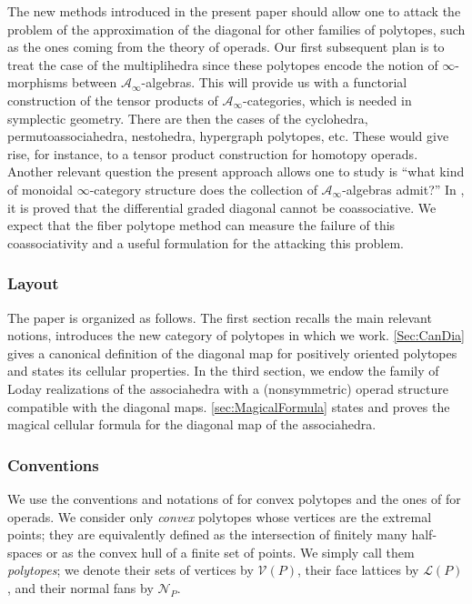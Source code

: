 \documentclass[11pt]{article}
\numberwithin{equation}{section}\providecommand{\No}{}
\let\mathcal\mathscr
\theoremstyle{plain}
\theoremstyle{definition}
\newcommand{\La}{\mathcal{L}}
\renewcommand{\No}{\mathcal{N}}
\newcommand{\Ve}{\mathcal{V}}
\begin{document}
The new methods introduced in the present paper should allow one to attack the problem of the approximation of the diagonal for other families of polytopes, such as the ones coming from the theory of operads.
Our first subsequent plan
is to treat the case of the multiplihedra \cite{Stasheff70} since these polytopes encode the notion of $\infty$-morphisms between $\mathcal{A}_\infty$-algebras. This will provide us with a functorial construction of the tensor products of $\mathcal{A}_\infty$-categories, which is needed in symplectic geometry.
There are then the cases of the cyclohedra, permutoassociahedra, nestohedra, hypergraph polytopes, etc. These would give rise, for instance, to a tensor product construction for homotopy operads. Another relevant question the present approach allows one to study is ``what kind of monoidal $\infty$-category structure does the collection of $\mathcal{A}_\infty$-algebras admit?''
In \cite{MarklShnider06}, it is proved that the differential graded diagonal cannot be coassociative. We expect that the fiber polytope method can measure the failure of this coassociativity and a useful formulation for the attacking this problem.

\subsubsection*{Layout}
The paper is organized as follows. The first section recalls the main relevant notions, introduces the new category of polytopes in which we work. \cref{Sec:CanDia} gives a canonical definition of the diagonal map for positively oriented polytopes and states its cellular properties. In the third section, we endow the family of Loday realizations of the associahedra with a (nonsymmetric) operad structure compatible with the diagonal maps. \cref{sec:MagicalFormula} states and proves the magical cellular formula for the diagonal map of the associahedra.

\subsubsection*{Conventions} We use the conventions and notations of \cite{Ziegler95} for convex polytopes and the ones of \cite{LodayVallette12} for operads. We consider only \emph{convex} polytopes whose vertices are the extremal points; they are equivalently defined as the intersection of finitely many half-spaces or as the convex hull of a finite set of points. We simply call them \emph{polytopes}; we denote their sets of vertices by $\Ve(P)$, their face lattices by $\La(P)$, and their normal fans by $\No_P$.
\end{document}
